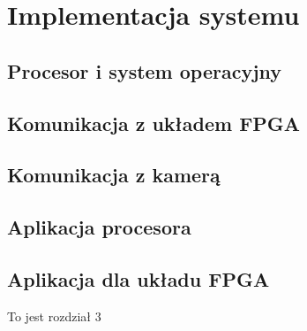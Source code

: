 \documentclass[document.tex]{subfiles}
\begin{document}
\chapter{Implementacja systemu}
\section{Procesor i system operacyjny}
\section{Komunikacja z układem FPGA}
\section{Komunikacja z kamerą}
\section{Aplikacja procesora}
\section{Aplikacja dla układu FPGA}
To jest rozdział 3
\end{document}
